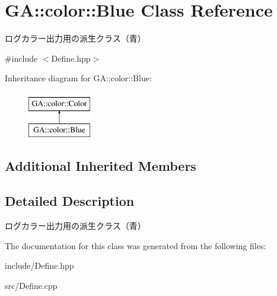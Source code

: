 \hypertarget{class_g_a_1_1color_1_1_blue}{}\section{GA\+::color\+::Blue Class Reference}
\label{class_g_a_1_1color_1_1_blue}


ログカラー出力用の派生クラス（青）  




{\ttfamily \#include $<$Define.\+hpp$>$}

Inheritance diagram for GA\+::color\+::Blue\+:\begin{figure}[H]
\begin{center}
\leavevmode
\includegraphics[height=2.000000cm]{class_g_a_1_1color_1_1_blue}
\end{center}
\end{figure}
\subsection*{Additional Inherited Members}


\subsection{Detailed Description}
ログカラー出力用の派生クラス（青） 



The documentation for this class was generated from the following files\+:\begin{DoxyCompactItemize}
\item 
include/Define.\+hpp\item 
src/Define.\+cpp\end{DoxyCompactItemize}
